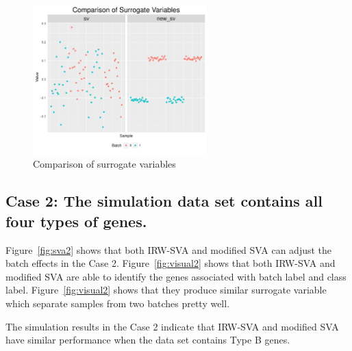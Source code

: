 \documentclass[11pt]{article}
\begin{document}
\begin{figure}
    \centering
    \includegraphics[width = 0.6\textwidth]{figures/vector1.pdf}
    \caption{Comparison of surrogate variables}
    \label{fig:vector1}
\end{figure}

\newpage

\subsection{Case 2: The simulation data set contains all four types of genes.}

Figure~\ref{fig:sva2} shows that both IRW-SVA and modified SVA can adjust the batch effects in the Case 2.  Figure~\ref{fig:visual2} shows that both IRW-SVA and modified SVA are able to identify the genes associated with batch label and class label. Figure~\ref{fig:visual2} shows that they produce similar surrogate variable which separate samples from two batches pretty well.

The simulation results in the Case 2 indicate that IRW-SVA and modified SVA have similar performance when the data set contains Type B genes.
\end{document}
